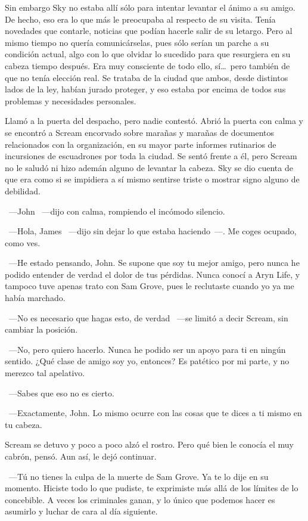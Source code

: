 Sin embargo Sky no estaba allí sólo para intentar levantar el ánimo a su amigo. De hecho, eso era lo que más le preocupaba al respecto de su visita. Tenía novedades que contarle, noticias que podían hacerle salir de su letargo. Pero al mismo tiempo no quería comunicárselas, pues sólo serían un parche a su condición actual, algo con lo que olvidar lo sucedido para que resurgiera en su cabeza tiempo después. Era muy consciente de todo ello, sí\dots\ pero también de que no tenía elección real. Se trataba de la ciudad que ambos, desde distintos lados de la ley, habían jurado proteger, y eso estaba por encima de todos sus problemas y necesidades personales.

Llamó a la puerta del despacho, pero nadie contestó. Abrió la puerta con calma y se encontró a Scream encorvado sobre marañas y marañas de documentos relacionados con la organización, en su mayor parte informes rutinarios de incursiones de escuadrones por toda la ciudad. Se sentó frente a él, pero Scream no le saludó ni hizo ademán alguno de levantar la cabeza. Sky se dio cuenta de que era como si se impidiera a sí mismo sentirse triste o mostrar signo alguno de debilidad.

~---John ~---dijo con calma, rompiendo el incómodo silencio.

~---Hola, James ~---dijo sin dejar lo que estaba haciendo~---. Me coges ocupado, como ves.

~---He estado pensando, John. Se supone que soy tu mejor amigo, pero nunca he podido entender de verdad el dolor de tus pérdidas. Nunca conocí a Aryn Life, y tampoco tuve apenas trato con Sam Grove, pues le reclutaste cuando yo ya me había marchado.

~---No es necesario que hagas esto, de verdad ~---se limitó a decir Scream, sin cambiar la posición.

~---No, pero quiero hacerlo. Nunca he podido ser un apoyo para ti en ningún sentido. ¿Qué clase de amigo soy yo, entonces? Es patético por mi parte, y no merezco tal apelativo.

~---Sabes que eso no es cierto.

~---Exactamente, John. Lo mismo ocurre con las cosas que te dices a ti mismo en tu cabeza.

Scream se detuvo y poco a poco alzó el rostro. Pero qué bien le conocía el muy cabrón, pensó. Aun así, le dejó continuar.

~---Tú no tienes la culpa de la muerte de Sam Grove. Ya te lo dije en su momento. Hiciste todo lo que pudiste, te exprimiste más allá de los límites de lo concebible. A veces los criminales ganan, y lo único que podemos hacer es asumirlo y luchar de cara al día siguiente.

